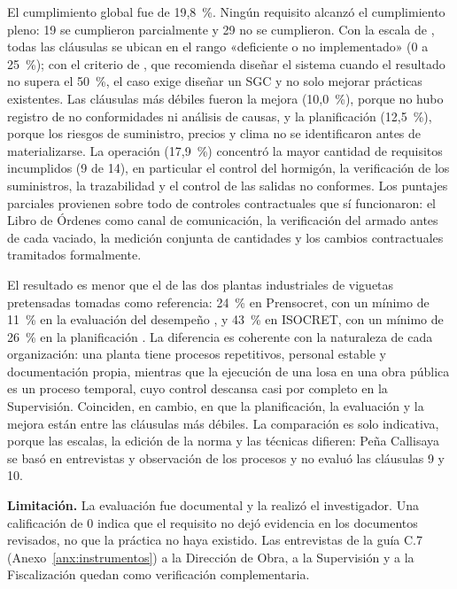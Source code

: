 El cumplimiento global fue de 19,8~\%. Ningún requisito alcanzó el cumplimiento pleno: 19 se cumplieron parcialmente y 29 no se cumplieron. Con la escala de \textcite[p.~42]{mamanicalsina2025}, todas las cláusulas se ubican en el rango «deficiente o no implementado» (0 a 25~\%); con el criterio de \textcite[p.~70]{pena2024}, que recomienda diseñar el sistema cuando el resultado no supera el 50~\%, el caso exige diseñar un SGC y no solo mejorar prácticas existentes. Las cláusulas más débiles fueron la mejora (10,0~\%), porque no hubo registro de no conformidades ni análisis de causas, y la planificación (12,5~\%), porque los riesgos de suministro, precios y clima no se identificaron antes de materializarse. La operación (17,9~\%) concentró la mayor cantidad de requisitos incumplidos (9 de 14), en particular el control del hormigón, la verificación de los suministros, la trazabilidad y el control de las salidas no conformes. Los puntajes parciales provienen sobre todo de controles contractuales que sí funcionaron: el Libro de Órdenes como canal de comunicación, la verificación del armado antes de cada vaciado, la medición conjunta de cantidades y los cambios contractuales tramitados formalmente.

El resultado es menor que el de las dos plantas industriales de viguetas pretensadas tomadas como referencia: 24~\% en Prensocret, con un mínimo de 11~\% en la evaluación del desempeño \parencite[pp.~48--49]{mamanicalsina2025}, y 43~\% en ISOCRET, con un mínimo de 26~\% en la planificación \parencite[p.~71]{pena2024}. La diferencia es coherente con la naturaleza de cada organización: una planta tiene procesos repetitivos, personal estable y documentación propia, mientras que la ejecución de una losa en una obra pública es un proceso temporal, cuyo control descansa casi por completo en la Supervisión. Coinciden, en cambio, en que la planificación, la evaluación y la mejora están entre las cláusulas más débiles. La comparación es solo indicativa, porque las escalas, la edición de la norma y las técnicas difieren: Peña Callisaya se basó en entrevistas y observación de los procesos \parencite[p.~67]{pena2024} y no evaluó las cláusulas 9 y 10.

\textbf{Limitación.} La evaluación fue documental y la realizó el investigador. Una calificación de 0 indica que el requisito no dejó evidencia en los documentos revisados, no que la práctica no haya existido. Las entrevistas de la guía C.7 (Anexo~\ref{anx:instrumentos}) a la Dirección de Obra, a la Supervisión y a la Fiscalización quedan como verificación complementaria. 

